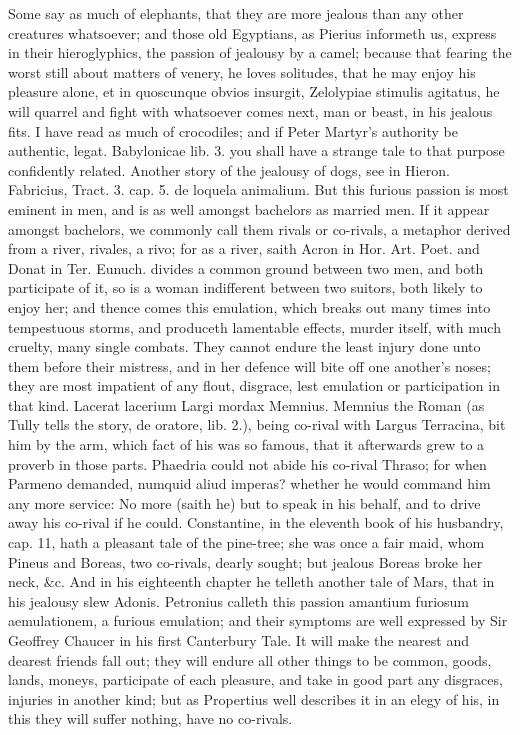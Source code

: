 {Some say as much of elephants, that they are more jealous than
any other creatures whatsoever; and those old Egyptians, as
Pierius informeth us, express in their hieroglyphics, the passion
of jealousy by a camel; because that fearing the worst still
about matters of venery, he loves solitudes, that he may enjoy his
pleasure alone, et in quoscunque obvios insurgit, Zelolypiae stimulis
agitatus, he will quarrel and fight with whatsoever comes next, man or
beast, in his jealous fits. I have read as much of crocodiles;
and if Peter Martyr's authority be authentic, legat. Babylonicae lib.
3. you shall have a strange tale to that purpose confidently related.
Another story of the jealousy of dogs, see in Hieron. Fabricius, Tract.
3. cap. 5. de loquela animalium.
But this furious passion is most eminent in men, and is as well amongst
bachelors as married men. If it appear amongst bachelors, we commonly
call them rivals or co-rivals, a metaphor derived from a river,
rivales, a rivo; for as a river, saith Acron in Hor. Art. Poet.
and Donat in Ter. Eunuch. divides a common ground between two men, and
both participate of it, so is a woman indifferent between two suitors,
both likely to enjoy her; and thence comes this emulation, which breaks
out many times into tempestuous storms, and produceth lamentable
effects, murder itself, with much cruelty, many single combats. They
cannot endure the least injury done unto them before their mistress,
and in her defence will bite off one another's noses; they are most
impatient of any flout, disgrace, lest emulation or participation in
that kind. Lacerat lacerium Largi mordax Memnius. Memnius the
Roman (as Tully tells the story, de oratore, lib. 2.), being co-rival
with Largus Terracina, bit him by the arm, which fact of his was so
famous, that it afterwards grew to a proverb in those parts.
Phaedria could not abide his co-rival Thraso; for when Parmeno
demanded, numquid aliud imperas? whether he would command him any more
service: No more (saith he) but to speak in his behalf, and to drive
away his co-rival if he could. Constantine, in the eleventh book of his
husbandry, cap. 11, hath a pleasant tale of the pine-tree; she
was once a fair maid, whom Pineus and Boreas, two co-rivals, dearly
sought; but jealous Boreas broke her neck, \&c. And in his eighteenth
chapter he telleth another tale of Mars, that in his jealousy
slew Adonis. Petronius calleth this passion amantium furiosum
aemulationem, a furious emulation; and their symptoms are well
expressed by Sir Geoffrey Chaucer in his first Canterbury Tale. It will
make the nearest and dearest friends fall out; they will endure all
other things to be common, goods, lands, moneys, participate of each
pleasure, and take in good part any disgraces, injuries in another
kind; but as Propertius well describes it in an elegy of his, in this
they will suffer nothing, have no co-rivals.

}
